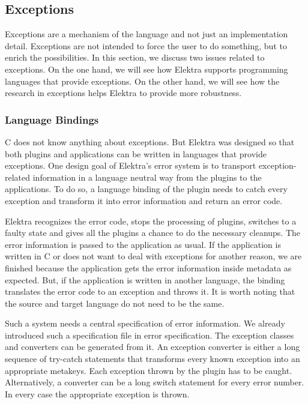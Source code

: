 \subsection*{Exceptions}

Exceptions are a mechanism of the language and not just an implementation detail. Exceptions are not intended to force the user to do something, but to enrich the possibilities. In this section, we discuss two issues related to exceptions. On the one hand, we will see how Elektra supports programming languages that provide exceptions. On the other hand, we will see how the research in exceptions helps Elektra to provide more robustness.

\subsubsection*{Language Bindings}

C does not know anything about exceptions. But Elektra was designed so that both plugins and applications can be written in languages that provide exceptions. One design goal of Elektra’s error system is to transport exception-\/related information in a language neutral way from the plugins to the applications. To do so, a language binding of the plugin needs to catch every exception and transform it into error information and return an error code.

Elektra recognizes the error code, stops the processing of plugins, switches to a faulty state and gives all the plugins a chance to do the necessary cleanups. The error information is passed to the application as usual. If the application is written in C or does not want to deal with exceptions for another reason, we are finished because the application gets the error information inside metadata as expected. But, if the application is written in another language, the binding translates the error code to an exception and throws it. It is worth noting that the source and target language do not need to be the same.

Such a system needs a central specification of error information. We already introduced such a specification file in error specification. The exception classes and converters can be generated from it. An exception converter is either a long sequence of try-\/catch statements that transforms every known exception into an appropriate metakeys. Each exception thrown by the plugin has to be caught. Alternatively, a converter can be a long switch statement for every error number. In every case the appropriate exception is thrown.

